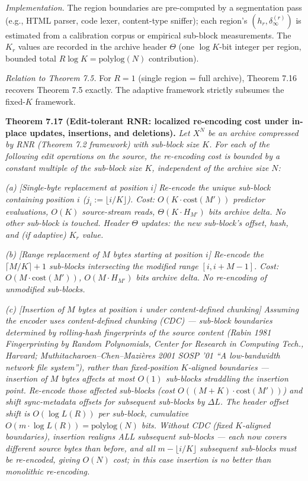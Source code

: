\documentclass[
]{article}
\begin{document}
\emph{Implementation.} The region boundaries are pre-computed by a
segmentation pass (e.g., HTML parser, code lexer, content-type
sniffer); each region's $(h_r, \delta_\infty^{(r)})$ is estimated
from a calibration corpus or empirical sub-block measurements. The
$K_r$ values are recorded in the archive header $\Theta$ (one
$\log K$-bit integer per region, bounded total $R \log K = \mathrm{polylog}(N)$
contribution).

\emph{Relation to Theorem 7.5.} For $R = 1$ (single region = full
archive), Theorem 7.16 recovers Theorem 7.5 exactly. The adaptive
framework strictly subsumes the fixed-$K$ framework.

\textbf{Theorem 7.17 (Edit-tolerant RNR: localized re-encoding cost
under in-place updates, insertions, and deletions).}
\emph{Let $X^N$ be an archive compressed by RNR (Theorem 7.2 framework)
with sub-block size $K$. For each of the following edit operations on
the source, the re-encoding cost is bounded by a constant multiple of
the sub-block size $K$, independent of the archive size $N$:}

\emph{(a) [Single-byte replacement at position $i$]} \emph{Re-encode
the unique sub-block containing position $i$ ($j_i := \lfloor i/K
\rfloor$). Cost: $O(K \cdot \mathrm{cost}(M'))$ predictor evaluations,
$O(K)$ source-stream reads, $\Theta(K \cdot H_{M'})$ bits archive
delta. No other sub-block is touched. Header $\Theta$ updates: the
new sub-block's offset, hash, and (if adaptive) $K_r$ value.}

\emph{(b) [Range replacement of $M$ bytes starting at position $i$]}
\emph{Re-encode the $\lceil M/K \rceil + 1$ sub-blocks intersecting
the modified range $[i, i+M-1]$. Cost: $O(M \cdot \mathrm{cost}(M'))$,
$O(M \cdot H_{M'})$ bits archive delta. No re-encoding of unmodified
sub-blocks.}

\emph{(c) [Insertion of $M$ bytes at position $i$ under content-defined
chunking]} \emph{Assuming the encoder uses \emph{content-defined
chunking} (CDC) --- sub-block boundaries determined by rolling-hash
fingerprints of the source content (Rabin 1981 \emph{Fingerprinting by
Random Polynomials}, Center for Research in Computing Tech., Harvard;
Muthitacharoen--Chen--Mazi{\`e}res 2001 \emph{SOSP '01} ``A low-bandwidth
network file system''), rather than fixed-position $K$-aligned
boundaries --- insertion of $M$ bytes affects at most $O(1)$
sub-blocks straddling the insertion point. Re-encode those affected
sub-blocks (cost $O((M+K) \cdot \mathrm{cost}(M'))$) and shift
sync-metadata offsets for subsequent sub-blocks by $\Delta L$. The
header offset shift is $O(\log L(R))$ per sub-block, cumulative
$O(m \cdot \log L(R)) = \mathrm{polylog}(N)$ bits. \emph{Without CDC}
(fixed $K$-aligned boundaries), insertion realigns ALL subsequent
sub-blocks --- each now covers different source bytes than before, and
all $m - \lfloor i/K \rfloor$ subsequent sub-blocks must be re-encoded,
giving $O(N)$ cost; in this case insertion is no better than monolithic
re-encoding.}
\end{document}
